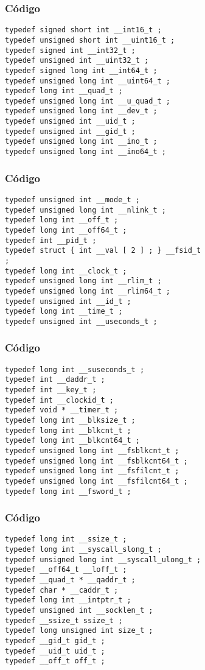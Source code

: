 \documentclass{beamer}
\begin{document}
\begin{frame}[fragile]
\frametitle{C\'odigo}
\begin{verbatim}
typedef signed short int __int16_t ; 
typedef unsigned short int __uint16_t ; 
typedef signed int __int32_t ; 
typedef unsigned int __uint32_t ; 
typedef signed long int __int64_t ; 
typedef unsigned long int __uint64_t ; 
typedef long int __quad_t ; 
typedef unsigned long int __u_quad_t ; 
typedef unsigned long int __dev_t ; 
typedef unsigned int __uid_t ; 
typedef unsigned int __gid_t ; 
typedef unsigned long int __ino_t ; 
typedef unsigned long int __ino64_t ; 
\end{verbatim}
\end{frame}
\begin{frame}[fragile]
\frametitle{C\'odigo}
\begin{verbatim}
typedef unsigned int __mode_t ; 
typedef unsigned long int __nlink_t ; 
typedef long int __off_t ; 
typedef long int __off64_t ; 
typedef int __pid_t ; 
typedef struct { int __val [ 2 ] ; } __fsid_t 
; 
typedef long int __clock_t ; 
typedef unsigned long int __rlim_t ; 
typedef unsigned long int __rlim64_t ; 
typedef unsigned int __id_t ; 
typedef long int __time_t ; 
typedef unsigned int __useconds_t ; 
\end{verbatim}
\end{frame}
\begin{frame}[fragile]
\frametitle{C\'odigo}
\begin{verbatim}
typedef long int __suseconds_t ; 
typedef int __daddr_t ; 
typedef int __key_t ; 
typedef int __clockid_t ; 
typedef void * __timer_t ; 
typedef long int __blksize_t ; 
typedef long int __blkcnt_t ; 
typedef long int __blkcnt64_t ; 
typedef unsigned long int __fsblkcnt_t ; 
typedef unsigned long int __fsblkcnt64_t ; 
typedef unsigned long int __fsfilcnt_t ; 
typedef unsigned long int __fsfilcnt64_t ; 
typedef long int __fsword_t ; 
\end{verbatim}
\end{frame}
\begin{frame}[fragile]
\frametitle{C\'odigo}
\begin{verbatim}
typedef long int __ssize_t ; 
typedef long int __syscall_slong_t ; 
typedef unsigned long int __syscall_ulong_t ; 
typedef __off64_t __loff_t ; 
typedef __quad_t * __qaddr_t ; 
typedef char * __caddr_t ; 
typedef long int __intptr_t ; 
typedef unsigned int __socklen_t ; 
typedef __ssize_t ssize_t ; 
typedef long unsigned int size_t ; 
typedef __gid_t gid_t ; 
typedef __uid_t uid_t ; 
typedef __off_t off_t ; 
\end{verbatim}
\end{frame}
\end{document}
